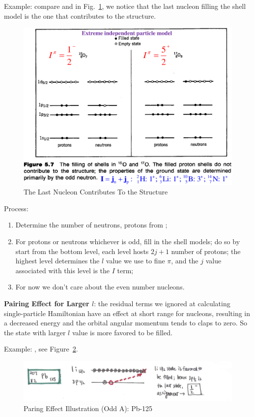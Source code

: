 \documentclass{school-22.101-notes}
\begin{document}
\clearpage
{} 
Example: compare  and  in Fig.~\ref{odd-A-nuclide}, we notice that the last nucleon filling the shell model is the one that contributes to the structure. 

\begin{figure}[ht]
  \centering
  \includegraphics[width=4.5in]{images/ns/odd-A-nuclide.png}
  \caption{The Last Nucleon Contributes To the Structure} \label{odd-A-nuclide}
\end{figure}

Process: 
\begin{enumerate}
\item Determine the number of neutrons, protons from ;
\item For protons or neutrons whichever is odd, fill in the shell models; do so by start from the bottom level, each level hosts $2j+1$ number of protons; the highest level determines the $l$ value we use to fine $\pi$, and the $j$ value associated with this level is the $I$ term;
\item For now we don't care about the even number nucleons. 
\end{enumerate}

\textbf{Pairing Effect for Larger $l$}: the residual terms we ignored at calculating single-particle Hamiltonian have an effect at short range for nucleons, resulting in a decreased energy and the orbital angular momentum tends to claps to zero. So the state with larger $l$ value is more favored to be filled. 

Example: , see Figure~\ref{ns-Pb-125}.
\begin{figure}[ht]
    \centering
    \includegraphics[width=5in]{images/ns/Pb-125.png}
    \caption{Paring Effect Illustration (Odd A): Pb-125}
    \label{ns-Pb-125}
\end{figure}
\end{document}

